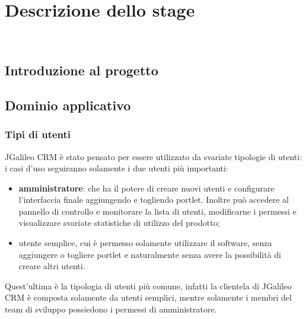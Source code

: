 
\chapter{Descrizione dello stage}
\label{cap:descrizione-stage}

\\

\section{Introduzione al progetto}

\section{Dominio applicativo}
\subsection{Tipi di utenti}
JGalileo CRM è stato pensato per essere utilizzato da svariate tipologie di utenti:
i casi d'uso seguiranno solamente i due utenti più importanti:
\begin{itemize}
	\item \textbf{amministratore}: che ha il potere di creare nuovi utenti e configurare l'interfaccia finale aggiungendo e togliendo \gls{portlet}. Inoltre può accedere al pannello di controllo e monitorare la lista di utenti, modificarne i permessi e visualizzare svariate statistiche di utilizzo del prodotto;
	\item{utente semplice}, cui è permesso solamente utilizzare il software, senza aggiungere o togliere \gls{portlet} e naturalmente senza avere la possibilità di creare altri utenti.\\
\end{itemize}
	Quest'ultima è la tipologia di utenti più comune, infatti la clientela di JGalileo CRM è composta solamente da utenti semplici, mentre solamente i membri del team di sviluppo possiedono i permessi di amministratore.
